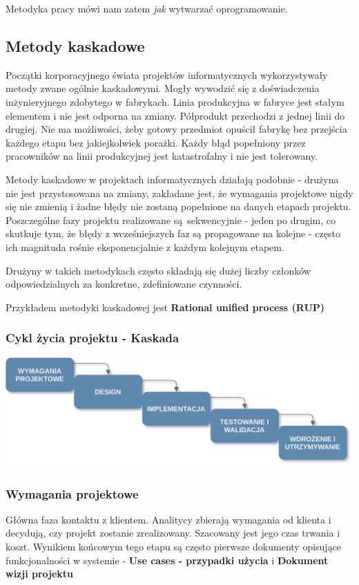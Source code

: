 \documentclass{article}
\begin{document}
Metodyka pracy mówi nam zatem \textit{jak} wytwarzać oprogramowanie.

\subsection{Metody kaskadowe}
Początki korporacyjnego świata projektów informatycznych wykorzystywały metody zwane ogólnie kaskadowymi. Mogły wywodzić się z doświadczenia inżynieryjnego zdobytego w fabrykach.\cite{scrum} Linia produkcyjna w fabryce jest
stałym elementem i nie jest odporna na zmiany. Półprodukt przechodzi z jednej linii do drugiej. Nie ma możliwości, żeby gotowy przedmiot opuścił fabrykę bez przejścia każdego etapu bez jakiejkolwiek porażki.
Każdy błąd popełniony przez pracowników na linii produkcyjnej jest katastrofalny i nie jest tolerowany.

Metody kaskadowe w projektach informatycznych działają podobnie - drużyna nie jest przystosowana na zmiany, zakładane jest, że wymagania projektowe nigdy się nie zmienią i żadne błędy nie zostaną popełnione na danych etapach projektu. Poszczególne fazy projektu realizowane są sekwencyjnie - jeden po drugim, co skutkuje tym, że błędy z wcześniejszych faz są propagowane na kolejne - często ich magnituda rośnie eksponencjalnie z każdym kolejnym etapem.

Drużyny w takich metodykach często składają się dużej liczby członków odpowiedzialnych za konkretne, zdefiniowane czynności.

Przykładem metodyki kaskadowej jest \textbf{Rational unified process (RUP)}

\subsubsection{Cykl życia projektu - Kaskada}
\begin{center}
    \includegraphics[scale=0.25]{waterfall_diagram.png}
\end{center}

\subsubsection*{Wymagania projektowe}
Główna faza kontaktu z klientem. Analitycy zbierają wymagania od klienta i decydują, czy projekt zostanie zrealizowany. Szacowany jest jego czas trwania i koszt. Wynikiem końcowym tego etapu są często pierwsze dokumenty opisujące funkcjonalności w systemie - \textbf{Use cases - przypadki użycia} i \textbf{Dokument wizji projektu}
\end{document}
